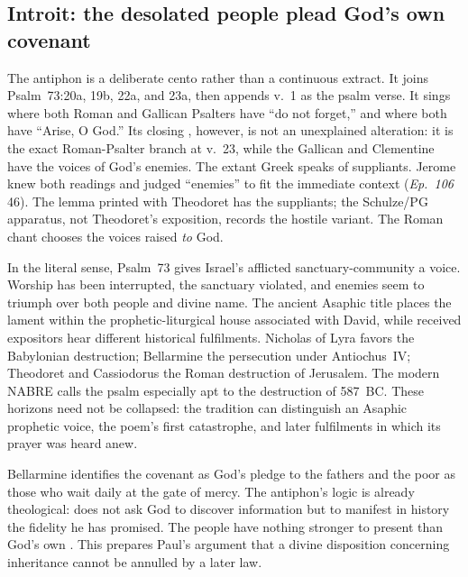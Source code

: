 \subsection*{Introit: the desolated people plead God's own covenant\enspace{}}

The antiphon is a deliberate cento rather than a continuous extract. It joins
Psalm~73:20a, 19b, 22a, and 23a, then appends v.~1 as the psalm verse. It sings
 where both Roman and Gallican Psalters have ``do not
forget,'' and  where both have ``Arise, O God.'' Its
closing , however, is not an unexplained alteration:
it is the exact Roman-Psalter branch at v.~23, while the Gallican and Clementine
have the voices of God's enemies. The extant Greek speaks of suppliants.
Jerome knew both readings and judged ``enemies'' to fit the immediate context
(\emph{Ep.~106} 46). The lemma printed with Theodoret has the suppliants; the
Schulze/PG apparatus, not Theodoret's exposition, records the hostile variant.
The Roman chant chooses the voices raised \emph{to} God.

In the literal sense, Psalm~73 gives Israel's afflicted sanctuary-community a
voice. Worship has been interrupted, the sanctuary violated, and enemies seem
to triumph over both people and divine name. The ancient Asaphic title places
the lament within the prophetic-liturgical house associated with David, while
received expositors hear different historical fulfilments. Nicholas of Lyra
favors the Babylonian destruction; Bellarmine the persecution under
Antiochus~IV; Theodoret and Cassiodorus the Roman destruction of Jerusalem.
The modern NABRE calls the psalm especially apt to the destruction of
587~BC. These horizons
need not be collapsed: the tradition can distinguish an Asaphic prophetic
voice, the poem's first catastrophe, and later fulfilments in which its prayer
was heard anew.

Bellarmine identifies the covenant as God's pledge to the fathers and the poor
as those who wait daily at the gate of mercy. The antiphon's logic is already
theological:  does not ask God to discover information but to
manifest in history the fidelity he has promised. The people have nothing
stronger to present than God's own . This prepares Paul's
argument that a divine disposition concerning inheritance cannot be annulled
by a later law.

